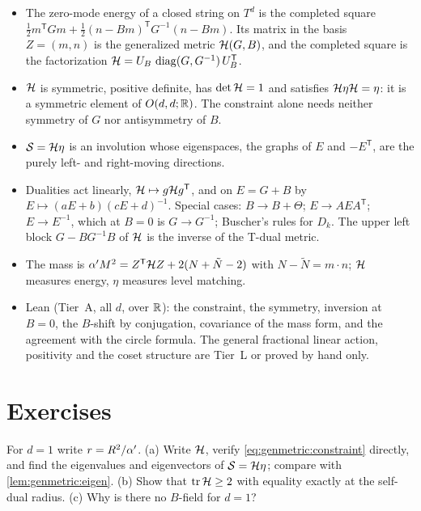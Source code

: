 \begin{summarybox}
\begin{itemize}[nosep,leftmargin=*]
\item The zero-mode energy of a closed string on $T^d$ is the completed square
 $\frac12m^{\mathsf T}Gm+\frac12(n-Bm)^{\mathsf T}G^{-1}(n-Bm)$. Its matrix in the basis
 $Z=(m,n)$ is the generalized metric $\mathcal{H}(G,B)$, and the completed square is the
 factorization $\mathcal{H}=U_B\,\operatorname{diag}(G,G^{-1})\,U_B^{\mathsf T}$.
\item $\mathcal{H}$ is symmetric, positive definite, has $\det\mathcal{H}=1$ and satisfies
 $\mathcal{H}\eta\mathcal{H}=\eta$: it is a symmetric element of $O(d,d;\mathbb{R})$. The constraint alone needs
 neither symmetry of $G$ nor antisymmetry of $B$.
\item $\mathcal S=\mathcal{H}\eta$ is an involution whose eigenspaces, the graphs of $E$ and
 $-E^{\mathsf T}$, are the purely left- and right-moving directions.
\item Dualities act linearly, $\mathcal{H}\mapsto g\mathcal{H} g^{\mathsf T}$, and on $E=G+B$ by
 $E\mapsto(aE+b)(cE+d)^{-1}$. Special cases: $B\to B+\Theta$; $E\to AEA^{\mathsf T}$;
 $E\to E^{-1}$, which at $B=0$ is $G\to G^{-1}$; Buscher's rules for $D_k$.
 The upper left block $G-BG^{-1}B$ of $\mathcal{H}$ is the inverse of the T-dual metric.
\item The mass is $\alpha' M^2=Z^{\mathsf T}\mathcal{H} Z+2(N+\tilde N-2)$ with $N-\tilde N=m\cdot n$;
 $\mathcal{H}$ measures energy, $\eta$ measures level matching.
\item Lean (Tier~A, all $d$, over $\mathbb{R}$): the constraint, the symmetry, inversion at $B=0$,
 the $B$-shift by conjugation, covariance of the mass form, and the agreement with the
 circle formula. The general fractional linear action, positivity and the coset structure
 are Tier~L or proved by hand only.
\end{itemize}
\end{summarybox}

\section*{Exercises}

\begin{exercise}[$\star$]\label{ex:genmetric:circle}
For $d=1$ write $r=R^2/\alpha'$. (a) Write $\mathcal{H}$, verify \eqref{eq:genmetric:constraint}
directly, and find the eigenvalues and eigenvectors of $\mathcal S=\mathcal{H}\eta$; compare with
\cref{lem:genmetric:eigen}. (b) Show that $\operatorname{tr}\mathcal{H}\ge2$ with equality exactly at the self-dual
radius. (c) Why is there no $B$-field for $d=1$?
\end{exercise}

